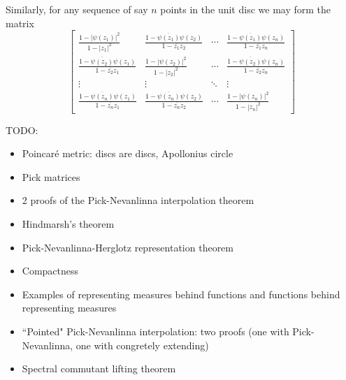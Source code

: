 Similarly, for any sequence of say $n$ points in the unit disc we may form the matrix
\[
	\begin{bmatrix}
		\frac{1 - |\psi(z_{1})|^{2}}{1 - |z_{1}|^{2}} & \frac{1 - \overline{\psi(z_{1})} \psi(z_{2})}{1 - \overline{z_{1}} z_{2}} & \cdots & \frac{1 - \overline{\psi(z_{1})} \psi(z_{n})}{1 - \overline{z_{1}} z_{n}} \\
		\frac{1 - \overline{\psi(z_{2})} \psi(z_{1})}{1 - \overline{z_{2}} z_{1}} & \frac{1 - |\psi(z_{2})|^{2}}{1 - |z_{2}|^{2}} & \cdots & \frac{1 - \overline{\psi(z_{2})} \psi(z_{n})}{1 - \overline{z_{2}} z_{n}} \\
		\vdots & \vdots & \ddots & \vdots \\
		\frac{1 - \overline{\psi(z_{n})} \psi(z_{1})}{1 - \overline{z_{n}} z_{1}} & \frac{1 - \overline{\psi(z_{n})} \psi(z_{2})}{1 - \overline{z_{n}} z_{2}} & \cdots &  \frac{1 - |\psi(z_{n})|^{2}}{1 - |z_{n}|^{2}}
	\end{bmatrix}
\]

TODO:
\begin{itemize}
	\item Poincaré metric: discs are discs, Apollonius circle
	\item Pick matrices
	\item 2 proofs of the Pick-Nevanlinna interpolation theorem
	\item Hindmarsh's theorem
	\item Pick-Nevanlinna-Herglotz representation theorem
	\item Compactness
	\item Examples of representing measures behind functions and functions behind representing measures
	\item ``Pointed" Pick-Nevanlinna interpolation: two proofs (one with Pick-Nevanlinna, one with congretely extending)
	\item Spectral commutant lifting theorem
\end{itemize}

